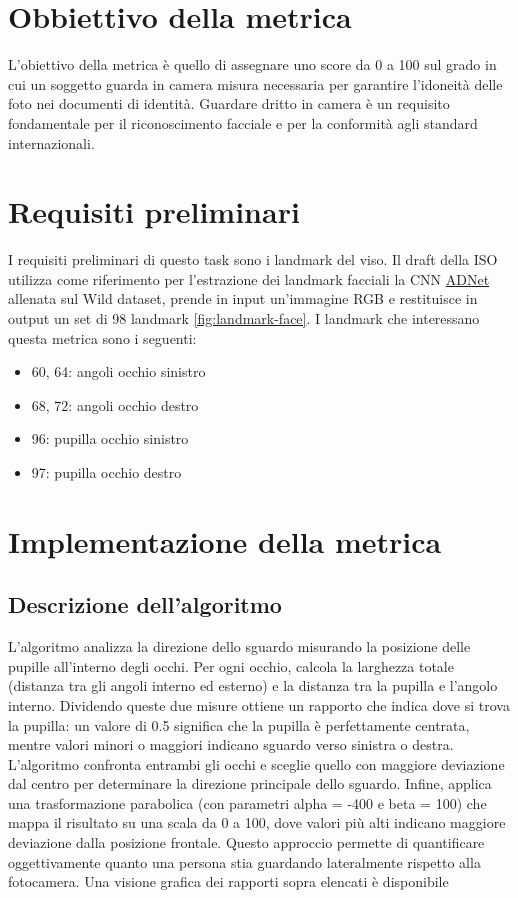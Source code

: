 \documentclass[12pt,a4paper,openright,twoside]{book}
\begin{document}
\section{Obbiettivo della metrica}
L’obiettivo della metrica è quello di assegnare uno score da 0 a 100 sul grado in cui un soggetto guarda in camera misura necessaria per garantire l’idoneità delle foto nei documenti di identità. Guardare dritto in camera è un requisito fondamentale per il riconoscimento facciale e per la conformità agli standard internazionali. 

\section{Requisiti preliminari}
I requisiti preliminari di questo task sono i landmark del viso. Il draft della ISO utilizza come riferimento per l'estrazione dei landmark facciali la CNN \href{https://github.com/huangyangyu/ADNet}{ADNet} allenata sul Wild dataset, prende in input un'immagine RGB e restituisce in output un set di 98 landmark \cref{fig:landmark-face}. I landmark che interessano questa metrica sono i seguenti:
\begin{itemize}
    \item 60, 64: angoli occhio sinistro
    \item 68, 72: angoli occhio destro
    \item 96: pupilla occhio sinistro
    \item 97: pupilla occhio destro
\end{itemize}

\section{Implementazione della metrica}


\subsection{Descrizione dell'algoritmo}
L'algoritmo analizza la direzione dello sguardo misurando la posizione delle pupille all'interno degli occhi. Per ogni occhio, calcola la larghezza totale (distanza tra gli angoli interno ed esterno) e la distanza tra la pupilla e l'angolo interno. Dividendo queste due misure ottiene un rapporto che indica dove si trova la pupilla: un valore di 0.5 significa che la pupilla è perfettamente centrata, mentre valori minori o maggiori indicano sguardo verso sinistra o destra. L'algoritmo confronta entrambi gli occhi e sceglie quello con maggiore deviazione dal centro per determinare la direzione principale dello sguardo. Infine, applica una trasformazione parabolica (con parametri alpha = -400 e beta = 100) che mappa il risultato su una scala da 0 a 100, dove valori più alti indicano maggiore deviazione dalla posizione frontale. Questo approccio permette di quantificare oggettivamente quanto una persona stia guardando lateralmente rispetto alla fotocamera.
Una visione grafica dei rapporti sopra elencati è disponibile 
\end{document}
